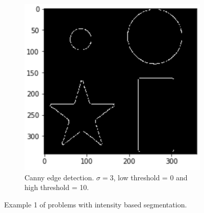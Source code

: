 \begin{figure}[H]
	\\
	\begin{subfigure}[b]{0.45\linewidth}
		\centering
		\includegraphics[width=\linewidth]{Materials/E4/canny_seg_res}
		\caption{Canny edge detection. $\sigma = 3$, low threshold = 0 and high threshold = 10.}
	\end{subfigure}
	\caption{Example 1 of problems with intensity based segmentation.}
	\label{ex1}
\end{figure}


